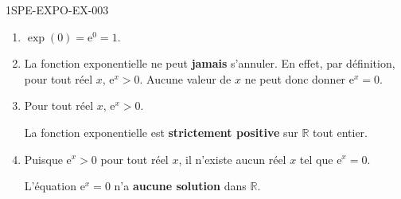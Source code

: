 \begin{corrige}{1SPE-EXPO-EX-003}
\begin{enumerate}
\item $\exp(0) = \mathrm{e}^0 = 1$.

\item La fonction exponentielle ne peut \textbf{jamais} s'annuler. En effet, par définition, pour tout réel $x$, $\mathrm{e}^x > 0$. Aucune valeur de $x$ ne peut donc donner $\mathrm{e}^x = 0$.

\item Pour tout réel $x$, $\mathrm{e}^x > 0$.

La fonction exponentielle est \textbf{strictement positive} sur $\mathbb{R}$ tout entier.

\item Puisque $\mathrm{e}^x > 0$ pour tout réel $x$, il n'existe aucun réel $x$ tel que $\mathrm{e}^x = 0$.

L'équation $\mathrm{e}^x = 0$ n'a \textbf{aucune solution} dans $\mathbb{R}$.
\end{enumerate}
\end{corrige}
